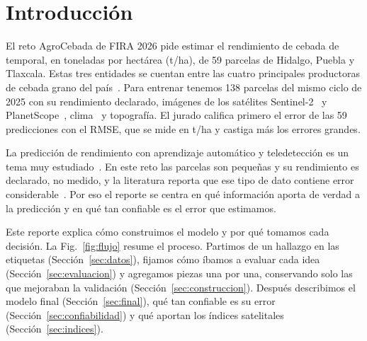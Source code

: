 \section{Introducción}\label{sec:intro}

El reto AgroCebada de FIRA 2026 pide estimar el rendimiento de cebada de temporal, en toneladas por hectárea (t/ha),
de 59 parcelas de Hidalgo, Puebla y Tlaxcala. Estas tres entidades se cuentan entre las cuatro principales productoras
de cebada grano del país~\cite{sader2025}. Para entrenar tenemos 138 parcelas del mismo ciclo de 2025 con su
rendimiento declarado, imágenes de los satélites Sentinel-2~\cite{drusch2012} y PlanetScope~\cite{frazier2021},
clima~\cite{funk2015,verdin2020} y topografía. El jurado califica primero el error de las 59 predicciones con el RMSE,
que se mide en t/ha y castiga más los errores grandes.

La predicción de rendimiento con aprendizaje automático y teledetección es un tema muy estudiado~\cite{vanklompenburg2020,weiss2020}.
En este reto las parcelas son pequeñas y su rendimiento es declarado, no medido, y la literatura reporta que ese tipo
de dato contiene error considerable~\cite{lobell2020}. Por eso el reporte se centra en qué información aporta de
verdad a la predicción y en qué tan confiable es el error que estimamos.

Este reporte explica cómo construimos el modelo y por qué tomamos cada decisión. La Fig.~\ref{fig:flujo} resume el
proceso. Partimos de un hallazgo en las etiquetas (Sección~\ref{sec:datos}), fijamos cómo íbamos a evaluar cada idea
(Sección~\ref{sec:evaluacion}) y agregamos piezas una por una, conservando solo las que mejoraban la validación
(Sección~\ref{sec:construccion}). Después describimos el modelo final (Sección~\ref{sec:final}), qué tan confiable es
su error (Sección~\ref{sec:confiabilidad}) y qué aportan los índices satelitales (Sección~\ref{sec:indices}).

